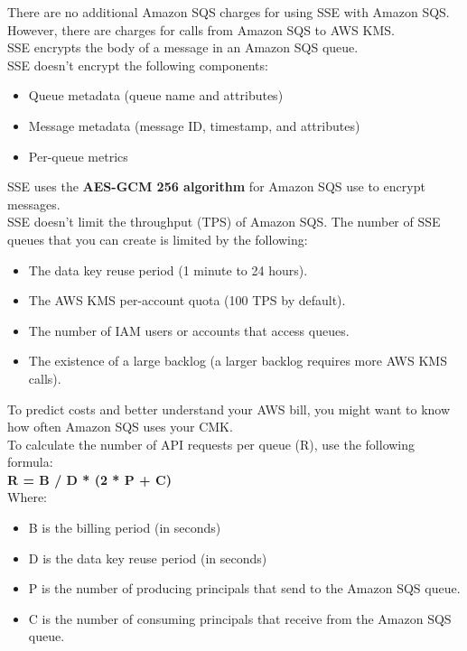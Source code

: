 \documentclass[12pt, letterpaper, twoside]{article}
\begin{document}
There are no additional Amazon SQS charges for using SSE with Amazon SQS. However, there are charges for calls from 
Amazon SQS to AWS KMS.\\

SSE encrypts the body of a message in an Amazon SQS queue.\\
SSE doesn't encrypt the following components:
\begin{itemize}
	\item Queue metadata (queue name and attributes)
	\item Message metadata (message ID, timestamp, and attributes)
	\item Per-queue metrics
\end{itemize}

SSE uses the \textbf{AES-GCM 256 algorithm} for Amazon SQS use to encrypt messages.\\

SSE doesn't limit the throughput (TPS) of Amazon SQS. The number of SSE queues that you can create is limited by 
the following:
\begin{itemize}
	\item The data key reuse period (1 minute to 24 hours).
	\item The AWS KMS per-account quota (100 TPS by default).
	\item The number of IAM users or accounts that access queues.
	\item The existence of a large backlog (a larger backlog requires more AWS KMS calls).
\end{itemize}

To predict costs and better understand your AWS bill, you might want to know how often Amazon SQS uses your CMK.\\
To calculate the number of API requests per queue (R), use the following formula:\\
\textbf{R = B / D * (2 * P + C)}\\
Where:
\begin{itemize}
	\item B is the billing period (in seconds)
	\item D is the data key reuse period (in seconds)
	\item P is the number of producing principals that send to the Amazon SQS queue.
	\item C is the number of consuming principals that receive from the Amazon SQS queue.
\end{itemize}
\end{document}
